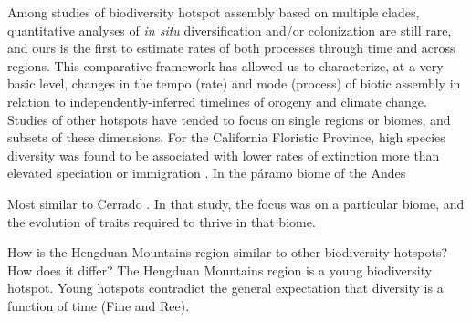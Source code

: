 


Among studies of biodiversity hotspot assembly based on multiple clades, quantitative analyses of \textit{in situ} diversification and/or colonization are still rare, and ours is the first to estimate rates of both processes through time and across regions. This comparative framework has allowed us to characterize, at a very basic level, changes in the tempo (rate) and mode (process) of biotic assembly in relation to independently-inferred timelines of orogeny and climate change. Studies of other hotspots have tended to focus on single regions or biomes, and subsets of these dimensions. For the California Floristic Province, high species diversity was found to be associated with lower rates of extinction more than elevated speciation or immigration \citep{lancaster2013}. In the páramo biome of the Andes


Most similar to Cerrado \citep{simon2009}. In that study, the focus was on a particular biome, and the evolution of traits required to thrive in that biome.



How is the Hengduan Mountains region similar to other biodiversity hotspots? How does it differ? The Hengduan Mountains region is a young biodiversity hotspot. Young hotspots contradict the general expectation that diversity is a function of time (Fine and Ree).

